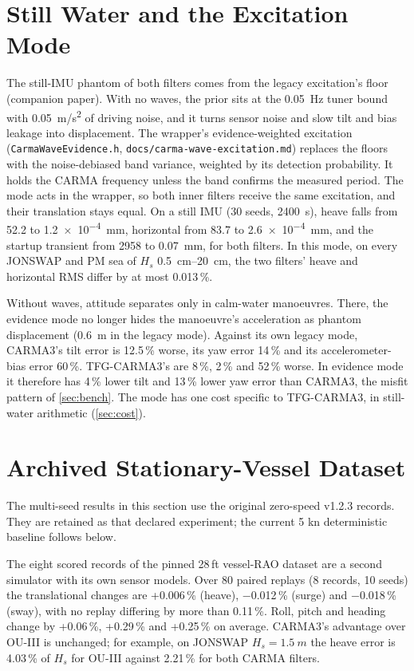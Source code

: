 \documentclass[conference]{IEEEtran}
\theoremstyle{bodysmall}
\begin{document}
\section{Still Water and the Excitation Mode}
\label{sec:quiet}
The still-IMU phantom of both filters comes from the legacy excitation's
floor (companion paper). With no waves, the prior sits at the \SI{0.05}{Hz}
tuner bound with \SI{0.05}{m/s^2} of driving noise, and it turns sensor
noise and slow tilt and bias leakage into displacement. The wrapper's
evidence-weighted excitation (\texttt{CarmaWaveEvidence.h},
\texttt{docs/carma-wave-excitation.md}) replaces the floors with the
noise-debiased band variance, weighted by its detection probability. It holds
the CARMA frequency unless the band confirms the measured period. The mode
acts in the wrapper, so both inner filters receive the same excitation, and
their translation stays equal. On a still IMU (30 seeds, \SI{2400}{s}),
heave falls from 52.2 to \SI{1.2e-4}{mm}, horizontal from 83.7 to
\SI{2.6e-4}{mm}, and the startup transient from 2958 to \SI{0.07}{mm}, for
both filters. In this mode, on every JONSWAP and PM sea of $H_s$
\SIrange{0.5}{20}{cm}, the two filters' heave and horizontal RMS differ by at
most 0.013\,\%.

Without waves, attitude separates only in calm-water manoeuvres. There, the
evidence mode no
longer hides the manoeuvre's acceleration as phantom displacement
(\SI{0.6}{m} in the legacy mode). Against its own legacy mode, CARMA3's tilt
error is 12.5\,\% worse, its yaw error 14\,\% and its accelerometer-bias
error 60\,\%. TFG-CARMA3's are 8\,\%, 2\,\% and 52\,\% worse. In evidence
mode it therefore has 4\,\% lower tilt and 13\,\% lower yaw error than
CARMA3, the misfit pattern of \cref{sec:bench}. The mode has one cost
specific to TFG-CARMA3, in still-water arithmetic (\cref{sec:cost}).

\section{Archived Stationary-Vessel Dataset}
The multi-seed results in this section use the original zero-speed v1.2.3
records. They are retained as that declared experiment; the current
5 kn deterministic baseline follows below.

\label{sec:dataset}
The eight scored records of the pinned 28\,ft vessel-RAO dataset are a second
simulator with its own sensor models. Over 80 paired replays (8 records,
10 seeds) the translational changes are +0.006\,\% (heave), $-$0.012\,\%
(surge) and $-$0.018\,\% (sway), with no replay differing by more than
0.11\,\%. Roll, pitch and heading change by +0.06\,\%, +0.29\,\% and +0.25\,\%
on average. CARMA3's advantage over OU-III is unchanged; for example, on
JONSWAP $H_s=\SI{1.5}{m}$ the heave error is 4.03\,\% of $H_s$ for OU-III
against 2.21\,\% for both CARMA filters.
\end{document}
